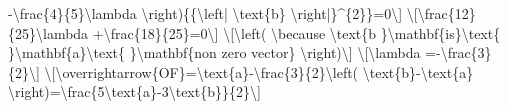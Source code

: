 -\textbackslash frac\{4\}\{5\}\textbackslash lambda \textbackslash right)\{\{\textbackslash left|
\textbackslash text\{b\} \textbackslash right|\}\textasciicircum\{2\}\}=0\textbackslash{]}
\textbackslash{[}\textbackslash frac\{12\}\{25\}\textbackslash lambda
+\textbackslash frac\{18\}\{25\}=0\textbackslash{]} \textbackslash{[}\textbackslash left(
\textbackslash because \textbackslash text\{b \}\textbackslash mathbf\{is\}\textbackslash text\{
\}\textbackslash mathbf\{a\}\textbackslash text\{ \}\textbackslash mathbf\{non
zero vector\} \textbackslash right)\textbackslash{]} \textbackslash{[}\textbackslash lambda
=-\textbackslash frac\{3\}\{2\}\textbackslash{]} \textbackslash{[}\textbackslash overrightarrow\{OF\}=\textbackslash text\{a\}-\textbackslash frac\{3\}\{2\}\textbackslash left(
\textbackslash text\{b\}-\textbackslash text\{a\} \textbackslash right)=\textbackslash frac\{5\textbackslash text\{a\}-3\textbackslash text\{b\}\}\{2\}\textbackslash{]}